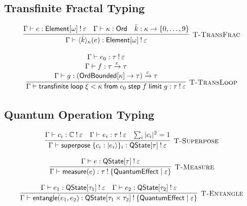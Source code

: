 \subsection{Transfinite Fractal Typing}
\label{subsec:transfinite-typing}

\begin{definition}
\label{def:transfinite-frac-rules}
\[
\infer[\textsc{T-TransFrac}]
  {\Gamma \vdash \langle \bar{k} \rangle_\kappa(e) : \mathsf{Element}[\omega] \mathbin{!} \varepsilon}
  {
    \Gamma \vdash e : \mathsf{Element}[\omega] \mathbin{!} \varepsilon &
    \Gamma \vdash \kappa : \mathsf{Ord} &
    \bar{k} : \kappa \to \{0, \ldots, 9\}
  }
\]

\[
\infer[\textsc{T-TransLoop}]
  {\Gamma \vdash \mathsf{transfinite}\;\mathsf{loop}\; \xi < \kappa\; \mathsf{from}\; e_0\; \mathsf{step}\; f\; \mathsf{limit}\; g : \tau \mathbin{!} \varepsilon}
  {
    \begin{array}{c}
    \Gamma \vdash e_0 : \tau \mathbin{!} \varepsilon \\
    \Gamma \vdash f : \tau \xrightarrow{\varepsilon} \tau \\
    \Gamma \vdash g : (\mathsf{OrdBounded}[\kappa] \to \tau) \xrightarrow{\varepsilon} \tau
    \end{array}
  }
\]
\end{definition}

\subsection{Quantum Operation Typing}
\label{subsec:quantum-typing}

\begin{definition}
\label{def:quantum-rules}
\[
\infer[\textsc{T-Superpose}]
  {\Gamma \vdash \mathsf{superpose}\;\{c_i : |e_i\rangle\}_i : \mathsf{QState}[\tau] \mathbin{!} \varepsilon}
  {
    \Gamma \vdash c_i : \mathbb{C} \mathbin{!} \varepsilon &
    \Gamma \vdash e_i : \tau \mathbin{!} \varepsilon &
    \sum_i |c_i|^2 = 1
  }
\]

\[
\infer[\textsc{T-Measure}]
  {\Gamma \vdash \mathsf{measure}(e) : \tau \mathbin{!} \{\mathsf{QuantumEffect} \mid \varepsilon\}}
  {\Gamma \vdash e : \mathsf{QState}[\tau] \mathbin{!} \varepsilon}
\]

\[
\infer[\textsc{T-Entangle}]
  {\Gamma \vdash \mathsf{entangle}(e_1, e_2) : \mathsf{QState}[\tau_1 \times \tau_2] \mathbin{!} \{\mathsf{QuantumEffect} \mid \varepsilon\}}
  {
    \Gamma \vdash e_1 : \mathsf{QState}[\tau_1] \mathbin{!} \varepsilon &
    \Gamma \vdash e_2 : \mathsf{QState}[\tau_2] \mathbin{!} \varepsilon
  }
\]
\end{definition}

